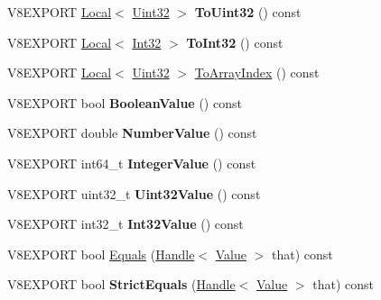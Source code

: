 \begin{DoxyCompactItemize}
\item 
\hypertarget{classv8_1_1_value_acaaf19acb4ff3f64f9ec39b95b3894ca}{}V8\+E\+X\+P\+O\+R\+T \hyperlink{classv8_1_1_local}{Local}$<$ \hyperlink{classv8_1_1_uint32}{Uint32} $>$ {\bfseries To\+Uint32} () const \label{classv8_1_1_value_acaaf19acb4ff3f64f9ec39b95b3894ca}

\item 
\hypertarget{classv8_1_1_value_aff185348c35e787a2994d81bafcea922}{}V8\+E\+X\+P\+O\+R\+T \hyperlink{classv8_1_1_local}{Local}$<$ \hyperlink{classv8_1_1_int32}{Int32} $>$ {\bfseries To\+Int32} () const \label{classv8_1_1_value_aff185348c35e787a2994d81bafcea922}

\item 
V8\+E\+X\+P\+O\+R\+T \hyperlink{classv8_1_1_local}{Local}$<$ \hyperlink{classv8_1_1_uint32}{Uint32} $>$ \hyperlink{classv8_1_1_value_ab6b19a1e5aa5df50dfbb5d2ffa60bcdc}{To\+Array\+Index} () const 
\item 
\hypertarget{classv8_1_1_value_a800fa027ad660d8ba9282acaaf10b03d}{}V8\+E\+X\+P\+O\+R\+T bool {\bfseries Boolean\+Value} () const \label{classv8_1_1_value_a800fa027ad660d8ba9282acaaf10b03d}

\item 
\hypertarget{classv8_1_1_value_a6eac2b07dced58f1761bbfd53bf0e366}{}V8\+E\+X\+P\+O\+R\+T double {\bfseries Number\+Value} () const \label{classv8_1_1_value_a6eac2b07dced58f1761bbfd53bf0e366}

\item 
\hypertarget{classv8_1_1_value_ae7a830af487dd14c32c3eb9a25981ab4}{}V8\+E\+X\+P\+O\+R\+T int64\+\_\+t {\bfseries Integer\+Value} () const \label{classv8_1_1_value_ae7a830af487dd14c32c3eb9a25981ab4}

\item 
\hypertarget{classv8_1_1_value_a7c36509ca7a9f004f115360fd5a15940}{}V8\+E\+X\+P\+O\+R\+T uint32\+\_\+t {\bfseries Uint32\+Value} () const \label{classv8_1_1_value_a7c36509ca7a9f004f115360fd5a15940}

\item 
\hypertarget{classv8_1_1_value_a60da7aefcf822457a338823c3d350fd5}{}V8\+E\+X\+P\+O\+R\+T int32\+\_\+t {\bfseries Int32\+Value} () const \label{classv8_1_1_value_a60da7aefcf822457a338823c3d350fd5}

\item 
V8\+E\+X\+P\+O\+R\+T bool \hyperlink{classv8_1_1_value_a643fcf5c7c6136d819b0b4927f8d1724}{Equals} (\hyperlink{classv8_1_1_handle}{Handle}$<$ \hyperlink{classv8_1_1_value}{Value} $>$ that) const 
\item 
\hypertarget{classv8_1_1_value_ab0fbab751e53493f77879c5fa431dca1}{}V8\+E\+X\+P\+O\+R\+T bool {\bfseries Strict\+Equals} (\hyperlink{classv8_1_1_handle}{Handle}$<$ \hyperlink{classv8_1_1_value}{Value} $>$ that) const \label{classv8_1_1_value_ab0fbab751e53493f77879c5fa431dca1}

\end{DoxyCompactItemize}


